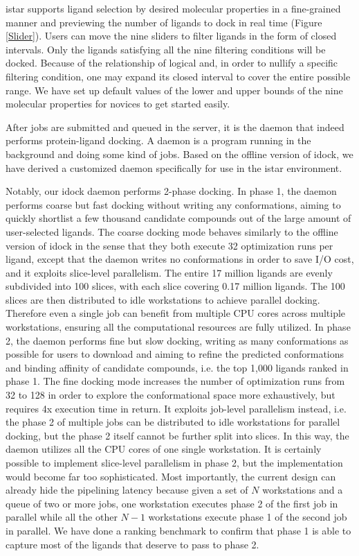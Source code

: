 \documentclass[10pt]{article}
\begin{document}
istar supports ligand selection by desired molecular properties in a fine-grained manner and previewing the number of ligands to dock in real time (Figure \ref{Slider}). Users can move the nine sliders to filter ligands in the form of closed intervals. Only the ligands satisfying all the nine filtering conditions will be docked. Because of the relationship of logical and, in order to nullify a specific filtering condition, one may expand its closed interval to cover the entire possible range. We have set up default values of the lower and upper bounds of the nine molecular properties for novices to get started easily.

After jobs are submitted and queued in the server, it is the daemon that indeed performs protein-ligand docking. A daemon is a program running in the background and doing some kind of jobs. Based on the offline version of idock, we have derived a customized daemon specifically for use in the istar environment.

Notably, our idock daemon performs 2-phase docking. In phase 1, the daemon performs coarse but fast docking without writing any conformations, aiming to quickly shortlist a few thousand candidate compounds out of the large amount of user-selected ligands. The coarse docking mode behaves similarly to the offline version of idock in the sense that they both execute 32 optimization runs per ligand, except that the daemon writes no conformations in order to save I/O cost, and it exploits slice-level parallelism. The entire 17 million ligands are evenly subdivided into 100 slices, with each slice covering 0.17 million ligands. The 100 slices are then distributed to idle workstations to achieve parallel docking. Therefore even a single job can benefit from multiple CPU cores across multiple workstations, ensuring all the computational resources are fully utilized. In phase 2, the daemon performs fine but slow docking, writing as many conformations as possible for users to download and aiming to refine the predicted conformations and binding affinity of candidate compounds, i.e. the top 1,000 ligands ranked in phase 1. The fine docking mode increases the number of optimization runs from 32 to 128 in order to explore the conformational space more exhaustively, but requires 4x execution time in return. It exploits job-level parallelism instead, i.e. the phase 2 of multiple jobs can be distributed to idle workstations for parallel docking, but the phase 2 itself cannot be further split into slices. In this way, the daemon utilizes all the CPU cores of one single workstation. It is certainly possible to implement slice-level parallelism in phase 2, but the implementation would become far too sophisticated. Most importantly, the current design can already hide the pipelining latency because given a set of $N$ workstations and a queue of two or more jobs, one workstation executes phase 2 of the first job in parallel while all the other $N-1$ workstations execute phase 1 of the second job in parallel. We have done a ranking benchmark to confirm that phase 1 is able to capture most of the ligands that deserve to pass to phase 2.
\end{document}
